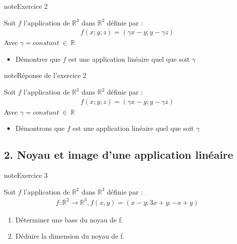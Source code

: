 \documentclass[letterpaper,10pt,french]{jupyterBook}
\begin{document}
\begin{sphinxadmonition}{note}{Exercice 2}

\sphinxAtStartPar
Soit \(f\) l’application de \(\mathbb{R}^3\) dans \(\mathbb{R}^2\) définie par :
\begin{equation*}
\begin{split}
f(x; y; z) = (\gamma x - y; y -\gamma z)
\end{split}
\end{equation*}
\sphinxAtStartPar
Avec \(\gamma = constant ~ \in ~\mathbb{R}\)
\begin{itemize}
\item {} 
\sphinxAtStartPar
Démontrer que \(f\) est une application linéaire quel que soit \(\gamma\)

\end{itemize}
\end{sphinxadmonition}

\begin{sphinxadmonition}{note}{Réponse de l’exercice 2}

\sphinxAtStartPar
Soit \(f\) l’application de \(\mathbb{R}^3\) dans \(\mathbb{R}^2\) définie par :
\begin{equation*}
\begin{split}
f(x; y; z) = (\gamma x - y; y -\gamma z)
\end{split}
\end{equation*}
\sphinxAtStartPar
Avec \(\gamma = constant ~ \in ~\mathbb{R}\)
\begin{itemize}
\item {} 
\sphinxAtStartPar
Démontrons que \(f\) est une application linéaire quel que soit \(\gamma\)

\end{itemize}
\end{sphinxadmonition}


\subsection{2. Noyau et image d’une application linéaire}
\label{\detokenize{S_xe9rie2:noyau-et-image-dune-application-lineaire}}
\begin{sphinxadmonition}{note}{Exercice 3}

\sphinxAtStartPar
Soit \(f\) l’application de \(\mathbb{R}^2\) dans \(\mathbb{R}^3\) définie par :
\begin{equation*}
\begin{split}
f : \mathbb{R}^2 \rightarrow \mathbb{R}^3, f(x, y) = (x - y; 3x + y; -x + y )
\end{split}
\end{equation*}\begin{enumerate}
%
\item {} 
\sphinxAtStartPar
Déterminer une base du noyau de f.

\item {} 
\sphinxAtStartPar
Déduire la dimension du noyau de f.

\end{enumerate}
\end{sphinxadmonition}
\end{document}
